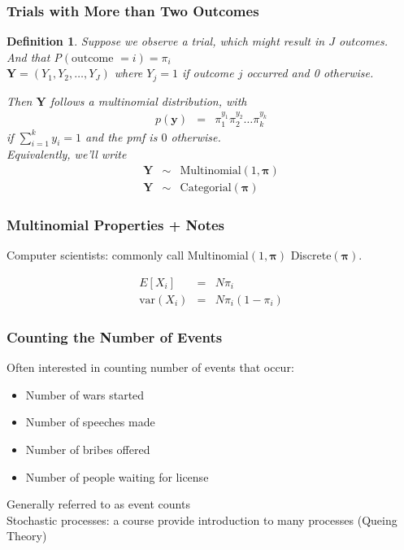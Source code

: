 \documentclass[handout]{beamer}
\newtheorem{defn}{Definition}
\numberwithin{equation}{section}
\begin{document}
\begin{frame}
\frametitle{Trials with More than Two Outcomes}


\begin{defn}
Suppose we observe a trial, which might result in $J$ outcomes.  \\
And that P$(\text{outcome } = i) = \pi_{i}$ \\
$\boldsymbol{Y} = (Y_{1}, Y_{2}, \hdots, Y_{J})$  where $Y_{j} = 1$ if outcome $j$ occurred and 0 otherwise. 

Then $\boldsymbol{Y}$ follows a \alert{multinomial} distribution, with \\
\begin{eqnarray}
p(\boldsymbol{y} ) & = & \pi_{1}^{y_{1}} \pi_{2}^{y_{2} } \hdots \pi_{k}^{y_{k}} \nonumber 
\end{eqnarray}
if $\sum_{i=1}^{k} y_{i} = 1$ and the pmf is $0$ otherwise.  \\
Equivalently, we'll write 
\begin{eqnarray}
\boldsymbol{Y} & \sim & \text{Multinomial}(1, \boldsymbol{\pi}) \nonumber \\
\boldsymbol{Y} & \sim & \text{Categorial}(\boldsymbol{\pi}) \nonumber 
\end{eqnarray}
\end{defn}
\end{frame}


\begin{frame}
\frametitle{Multinomial Properties + Notes}
Computer scientists: commonly call Multinomial$(1, \boldsymbol{\pi})$ \alert{Discrete}$(\boldsymbol{\pi})$. 

\begin{eqnarray}
E[X_{i} ] & = &  N \pi_{i} \nonumber \\
\text{var}(X_{i} ) & = &  N \pi_{i} (1- \pi_{i}) \nonumber 
\end{eqnarray}

\end{frame}

\begin{frame}
\frametitle{Counting the Number of Events}

Often interested in counting number of events that occur:
\begin{itemize}
\item[1)] Number of wars started
\item[2)] Number of speeches made
\item[3)] Number of bribes offered
\item[4)] Number of people waiting for license
\end{itemize}

Generally referred to as \alert{event counts}\\
\alert{Stochastic processes}: a course provide introduction to many processes (\alert{Queing Theory})


\end{frame}
\end{document}
